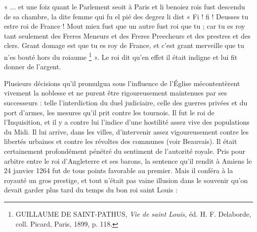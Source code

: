 \documentclass[french,twoside]{book} %
\newenvironment{quoteblock}%
  {\begin{quoting}}
  {\end{quoting}}
\newenvironment{quotebar}{%
    \def\FrameCommand{{\color{rubric!10!}\vrule width 0.5em} \hspace{0.9em}}%
    \def\OuterFrameSep{\itemsep} %
    \MakeFramed {\advance\hsize-\width \FrameRestore}
  }%
  {%
    \endMakeFramed
  }
\renewenvironment{quoteblock}%
  {%
    \small
    \savenotes
    \begin{quotebar}
  }
  {%
    \end{quotebar}
    \spewnotes
  }
\begin{document}
\begin{quoteblock}
\noindent « ... et une foiz quant le Parlement seoit à Paris et li benoiez rois fust descendu de sa chambre, la dite femme qui fu el pié des degrez li dist « Fi ! fi ! Deusses tu estre roi de France ! Mout miex fust que un autre fust roi que tu ; car tu es roy tant seulement des Freres Meneurs et des Freres Preecheurs et des prestres et des clers. Grant domage est que tu es roy de France, et c’est grant merveille que tu n’es bouté hors du roiaume \footnote{ GUILLAUME DE SAINT-PATHUS, {\itshape Vie de saint Louis}, éd. H. F. Delaborde, coll. Picard, Paris, 1899, p. 118.} ». Le roi dit qu’en effet il était indigne et lui fit donner de l’argent.\end{quoteblock}

\noindent Plusieurs décisions qu’il promulgua sous l’influence de l’Église mécontentèrent vivement la noblesse et ne purent être rigoureusement maintenues par ses successeurs : telle l’interdiction du duel judiciaire, celle des guerres privées et du port d’armes, les mesures qu’il prit contre les tournois. Il fut le roi de l’Inquisition, et il y a contre lui l’indice d’une hostilité assez vive des populations du Midi. Il lui arrive, dans les villes, d’intervenir assez vigoureusement contre les libertés urbaines et contre les révoltes des communes (voir Beauvais). Il était certainement profondément pénétré du sentiment de l’autorité royale. Pris pour arbitre entre le roi d’Angleterre et ses barons, la sentence qu’il rendit à Amiens le 24 janvier 1264 fut de tous points favorable au premier. Mais il conféra à la royauté un gros prestige, et tout n’était pas vaine illusion dans le souvenir qu’on devait garder plus tard du temps du bon roi saint Louis :\par
\end{document}
